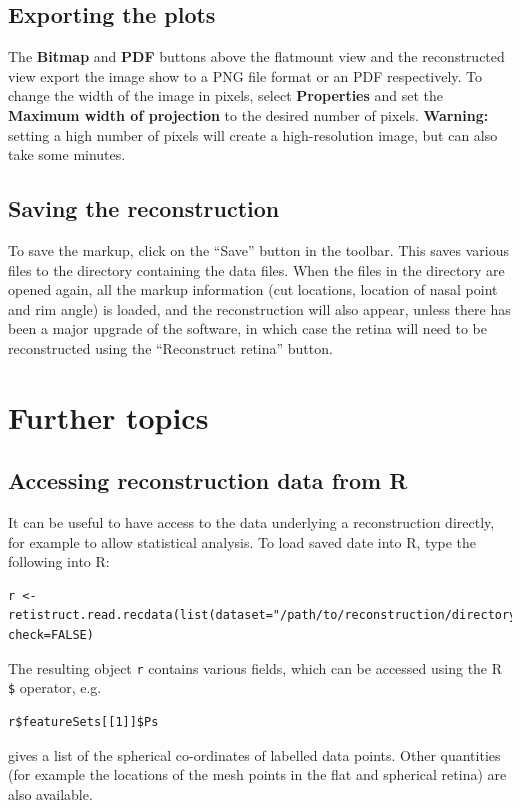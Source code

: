 \documentclass{book}
\begin{document}
\section{Exporting the plots}
\label{retistruct-user-guide:sec:exporting-plots}

The \textbf{Bitmap} and \textbf{PDF} buttons above the flatmount view
and the reconstructed view export the image show to a PNG file format
or an PDF respectively. To change the width of the image in pixels,
select \textbf{Properties} and set the
\textbf{Maximum width of projection} to the desired number of pixels.
\textbf{Warning:} setting a high number of pixels will create a
high-resolution image, but can also take some minutes.

\section{Saving the reconstruction}
\label{manual:sec:saving-reconstr}

To save the markup, click on the ``Save'' button in the toolbar. This
saves various files to the directory containing the data files. When
the files in the directory are opened again, all the markup
information (cut locations, location of nasal point and rim angle) is
loaded, and the reconstruction will also appear, unless there has been
a major upgrade of the software, in which case the retina will need to
be reconstructed using the ``Reconstruct retina'' button.

\chapter{Further topics}
\label{retistruct-user-guide:cha:advanced-topics}

\section{Accessing reconstruction data from R}
\label{retistruct-user-guide:sec:reading-date-into}

It can be useful to have access to the data underlying a
reconstruction directly, for example to allow statistical analysis.
To load saved date into R, type the following into R:
\begin{verbatim}
r <-
retistruct.read.recdata(list(dataset="/path/to/reconstruction/directory"),
check=FALSE)
\end{verbatim}
The resulting object \texttt{r} contains various fields, which can be
accessed using the R \texttt{\$} operator, e.g.
\begin{verbatim}
r$featureSets[[1]]$Ps
\end{verbatim}
gives a list of the spherical co-ordinates of labelled data points.
Other quantities (for example the locations of the mesh points in the
flat and spherical retina) are also available.
\end{document}

